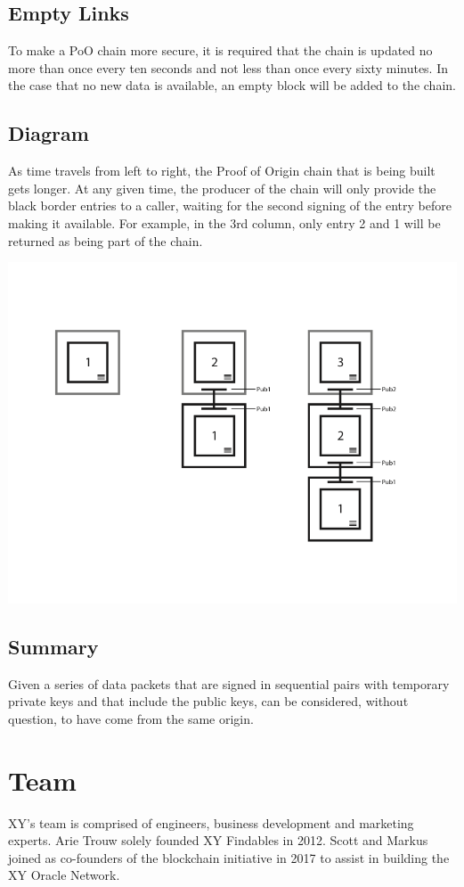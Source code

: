 \documentclass{article}
\begin{document}
\subsection {Empty Links}
To make a PoO chain more secure, it is required that the chain is updated no more than once every ten seconds and not less than once every sixty minutes.  In the case that no new data is available, an empty block will be added to the chain.

\subsection {Diagram}
As time travels from left to right, the Proof of Origin chain that is being built gets longer.  At any given time, the producer of the chain will only provide the black border entries to a caller, waiting for the second signing of the entry before making it available.  For example, in the 3rd column, only entry 2 and 1 will be returned as being part of the chain.

\includegraphics[width=\textwidth] {proofoforigin}

\subsection {Summary}
Given a series of data packets that are signed in sequential pairs with temporary private keys and that include the public keys, can be considered, without question, to have come from the same origin.

\clearpage
\section {Team}
XY's team is comprised of engineers, business development and marketing experts. Arie Trouw solely founded XY Findables in 2012. Scott and Markus joined as co-founders of the blockchain initiative in 2017 to assist in building the XY Oracle Network.
\end{document}
